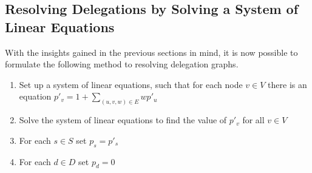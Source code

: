 \subsection{Resolving Delegations by Solving a System of Linear Equations}

With the insights gained in the previous sections in mind, it is now possible to formulate the following method to resolving delegation graphs.

\begin{enumerate}
\item Set up a system of linear equations, such that for each node $v \in V$ there is an equation $p'_v = 1+\sum_{(u, v, w) \in E}wp'_u$
\item Solve the system of linear equations to find the value of $p'_v$ for all $v \in V$
\item For each $s \in S$ set $p_s = p'_s$
\item For each $d \in D$ set $p_d = 0$
\end{enumerate}

